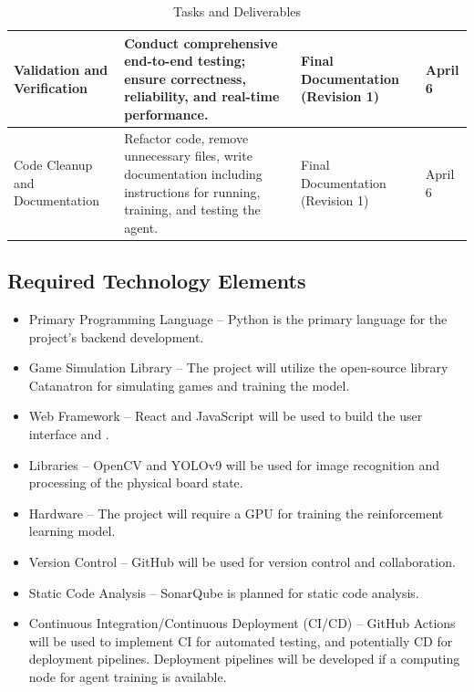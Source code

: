 \documentclass{article}
\begin{document}
\begin{table}[H]
\begin{tabular}{|p{3cm}|p{5cm}|p{3cm}|p{2cm}|}
    Validation and Verification & Conduct comprehensive end-to-end testing; ensure correctness, reliability, and real-time performance. & Final Documentation (Revision 1) & April 6 \\ \hline
    
    Code Cleanup and Documentation & Refactor code, remove unnecessary files, write documentation including instructions for running, training, and testing the agent. & Final Documentation (Revision 1) & April 6 \\ \hline
    
    \end{tabular}
    \caption{Tasks and Deliverables}
    \label{tab:tasks-deliverables}
    \end{table}
    


\subsection{Required Technology Elements}\label{subsec:requiredtech}
\begin{itemize}
    \item {Primary Programming Language} – Python is the primary language for the project's backend development.
    \item {Game Simulation Library} – The project will utilize the open-source library Catanatron for simulating \emph{\Catan{}} games and training the \AI{} model.
    \item {Web Framework} – React and JavaScript will be used to build the user interface and \DigitalTwin{}.
    \item {\CV{} Libraries} – OpenCV and YOLOv9 will be used for image recognition and processing of the physical board state.
    \item {Hardware} – The project will require a GPU for training the reinforcement learning model.
    \item {Version Control} – GitHub will be used for version control and collaboration.
    \item {Static Code Analysis} – SonarQube is planned for static code analysis.
    \item {Continuous Integration/Continuous Deployment (CI/CD)} – GitHub Actions will be used to implement CI for automated testing, and potentially CD for deployment pipelines. Deployment pipelines will be developed if a computing node for \RL{} agent training is available.
\end{itemize}
\end{document}
